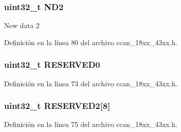\subsubsection[{\texorpdfstring{N\+D2}{ND2}}]{ uint32\+\_\+t N\+D2}\hypertarget{struct_l_p_c___c_c_a_n___t_a7cdfd206e6aee18d476f1494b788283e}{}\label{struct_l_p_c___c_c_a_n___t_a7cdfd206e6aee18d476f1494b788283e}
New data 2 

Definición en la línea 80 del archivo ccan\+\_\+18xx\+\_\+43xx.\+h.

\subsubsection[{\texorpdfstring{R\+E\+S\+E\+R\+V\+E\+D0}{RESERVED0}}]{ uint32\+\_\+t R\+E\+S\+E\+R\+V\+E\+D0}\hypertarget{struct_l_p_c___c_c_a_n___t_ad06839c5382047f4f9f2c74cc61db942}{}\label{struct_l_p_c___c_c_a_n___t_ad06839c5382047f4f9f2c74cc61db942}


Definición en la línea 73 del archivo ccan\+\_\+18xx\+\_\+43xx.\+h.

\subsubsection[{\texorpdfstring{R\+E\+S\+E\+R\+V\+E\+D2}{RESERVED2}}]{ uint32\+\_\+t R\+E\+S\+E\+R\+V\+E\+D2\mbox{[}8\mbox{]}}\hypertarget{struct_l_p_c___c_c_a_n___t_a05d028eb06656a3055efdf2949c42708}{}\label{struct_l_p_c___c_c_a_n___t_a05d028eb06656a3055efdf2949c42708}


Definición en la línea 75 del archivo ccan\+\_\+18xx\+\_\+43xx.\+h.


